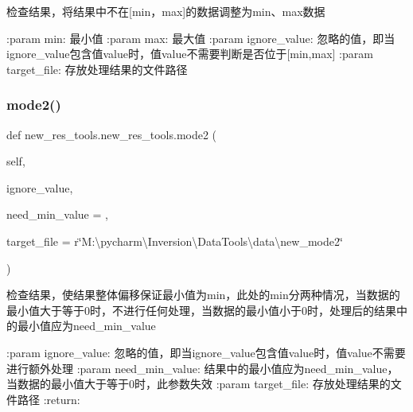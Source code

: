 \begin{DoxyVerb}检查结果，将结果中不在[min，max]的数据调整为min、max数据

:param min: 最小值
:param max: 最大值
:param ignore_value: 忽略的值，即当ignore_value包含值value时，值value不需要判断是否位于[min,max]
:param target_file: 存放处理结果的文件路径
\end{DoxyVerb}
 \mbox{\label{classnew__res__tools_1_1new__res__tools_aebe00bcd2bfd2ff3c6b9b37a43aad986}} 
\subsubsection{\texorpdfstring{mode2()}{mode2()}}
{\footnotesize\ttfamily def new\+\_\+res\+\_\+tools.\+new\+\_\+res\+\_\+tools.\+mode2 (\begin{DoxyParamCaption}\item[{}]{self,  }\item[{}]{ignore\+\_\+value,  }\item[{}]{need\+\_\+min\+\_\+value = {},  }\item[{}]{target\+\_\+file = {\ttfamily r\char`\"{}M\+:\textbackslash{}pycharm\textbackslash{}Inversion\textbackslash{}DataTools\textbackslash{}data\textbackslash{}new\+\_\+mode2\char`\"{}} }\end{DoxyParamCaption})}

\begin{DoxyVerb}检查结果，使结果整体偏移保证最小值为min，此处的min分两种情况，当数据的最小值大于等于0时，不进行任何处理，当数据的最小值小于0时，处理后的结果中的最小值应为need_min_value

:param ignore_value: 忽略的值，即当ignore_value包含值value时，值value不需要进行额外处理
:param need_min_value: 结果中的最小值应为need_min_value，当数据的最小值大于等于0时，此参数失效
:param target_file: 存放处理结果的文件路径
:return:
\end{DoxyVerb}
 \mbox{\label{classnew__res__tools_1_1new__res__tools_a96a6b58a3dc3288188605d01baaef30b}} 
